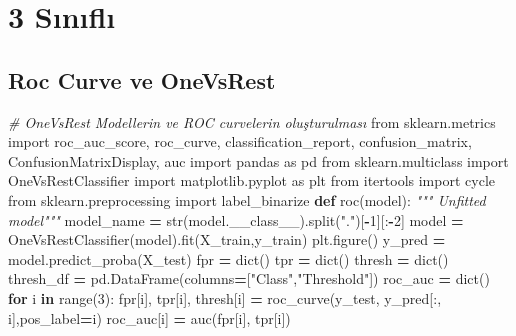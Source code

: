 \documentclass[12pt,twoside]{deuthesis}
\newenvironment{Shaded}{\begin{snugshade}}{\end{snugshade}}
\newcommand{\BuiltInTok}[1]{#1}
\newcommand{\CommentTok}[1]{\textcolor[rgb]{0.56,0.35,0.01}{\textit{#1}}}
\newcommand{\ControlFlowTok}[1]{\textcolor[rgb]{0.13,0.29,0.53}{\textbf{#1}}}
\newcommand{\DecValTok}[1]{\textcolor[rgb]{0.00,0.00,0.81}{#1}}
\newcommand{\ImportTok}[1]{#1}
\newcommand{\KeywordTok}[1]{\textcolor[rgb]{0.13,0.29,0.53}{\textbf{#1}}}
\newcommand{\NormalTok}[1]{#1}
\newcommand{\OperatorTok}[1]{\textcolor[rgb]{0.81,0.36,0.00}{\textbf{#1}}}
\newcommand{\StringTok}[1]{\textcolor[rgb]{0.31,0.60,0.02}{#1}}
\begin{document}
\hypertarget{sux131nux131flux131}{%
\chapter{3 Sınıflı}\label{sux131nux131flux131}}

\hypertarget{roc-curve-ve-onevsrest}{%
\section{Roc Curve ve OneVsRest}\label{roc-curve-ve-onevsrest}}
\begin{Shaded}
\begin{Highlighting}[]
\CommentTok{\# OneVsRest Modellerin ve ROC curvelerin oluşturulması}
\ImportTok{from}\NormalTok{ sklearn.metrics }\ImportTok{import}\NormalTok{ roc\_auc\_score, roc\_curve, classification\_report, confusion\_matrix, ConfusionMatrixDisplay, auc}
\ImportTok{import}\NormalTok{ pandas }\ImportTok{as}\NormalTok{ pd}
\ImportTok{from}\NormalTok{ sklearn.multiclass }\ImportTok{import}\NormalTok{ OneVsRestClassifier}
\ImportTok{import}\NormalTok{ matplotlib.pyplot }\ImportTok{as}\NormalTok{ plt}
\ImportTok{from}\NormalTok{ itertools }\ImportTok{import}\NormalTok{ cycle}
\ImportTok{from}\NormalTok{ sklearn.preprocessing }\ImportTok{import}\NormalTok{ label\_binarize}
\KeywordTok{def}\NormalTok{ roc(model):}
    \CommentTok{""" Unfitted model"""}
\NormalTok{    model\_name }\OperatorTok{=} \BuiltInTok{str}\NormalTok{(model.\_\_class\_\_).split(}\StringTok{"."}\NormalTok{)[}\OperatorTok{{-}}\DecValTok{1}\NormalTok{][:}\OperatorTok{{-}}\DecValTok{2}\NormalTok{]}
\NormalTok{    model }\OperatorTok{=}\NormalTok{ OneVsRestClassifier(model).fit(X\_train,y\_train)}
\NormalTok{    plt.figure()}
\NormalTok{    y\_pred }\OperatorTok{=}\NormalTok{ model.predict\_proba(X\_test)}
\NormalTok{    fpr }\OperatorTok{=} \BuiltInTok{dict}\NormalTok{()}
\NormalTok{    tpr }\OperatorTok{=} \BuiltInTok{dict}\NormalTok{()}
\NormalTok{    thresh }\OperatorTok{=} \BuiltInTok{dict}\NormalTok{()}
\NormalTok{    thresh\_df }\OperatorTok{=}\NormalTok{ pd.DataFrame(columns}\OperatorTok{=}\NormalTok{[}\StringTok{"Class"}\NormalTok{,}\StringTok{"Threshold"}\NormalTok{])}
\NormalTok{    roc\_auc }\OperatorTok{=} \BuiltInTok{dict}\NormalTok{()}
    \ControlFlowTok{for}\NormalTok{ i }\KeywordTok{in} \BuiltInTok{range}\NormalTok{(}\DecValTok{3}\NormalTok{):}
\NormalTok{        fpr[i], tpr[i], thresh[i] }\OperatorTok{=}\NormalTok{ roc\_curve(y\_test, y\_pred[:, i],pos\_label}\OperatorTok{=}\NormalTok{i)}
\NormalTok{        roc\_auc[i] }\OperatorTok{=}\NormalTok{ auc(fpr[i], tpr[i])}

\end{Highlighting}
\end{Shaded}
\end{document}
